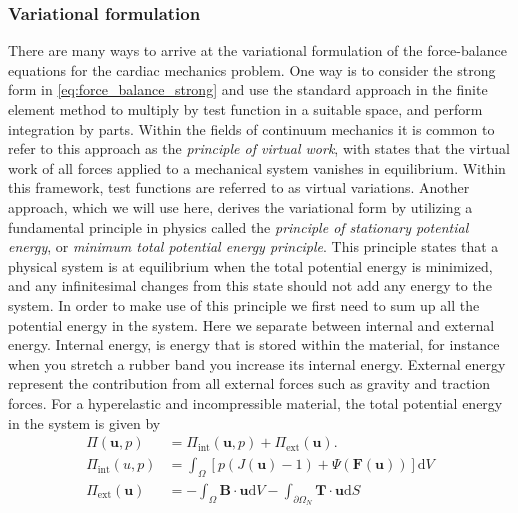 \subsubsection{Variational formulation}
\label{sec:variational_formulation}
There are many ways to arrive at the variational formulation of the
force-balance equations for the cardiac mechanics problem.  One way is
to consider the strong form in \eqref{eq:force_balance_strong} and use
the standard approach in the finite element method to multiply by
test function in a suitable space, and perform integration by
parts. Within the fields of continuum mechanics it is common to
refer to this approach as the \emph{principle of virtual work}, with states
that the virtual work of all forces applied to a mechanical system
vanishes in equilibrium. Within this framework, test functions are
referred to as virtual variations.
Another approach, which we will use here, derives the variational form
by utilizing a fundamental principle in physics
called the \emph{principle of stationary potential energy}, or
\emph{minimum total potential energy principle}. This principle states that a
physical system is at equilibrium when the total potential energy is
minimized, and any infinitesimal changes from this state should not add
any energy to the system.
In order to make use of this principle we first need to sum up all the
potential energy in the system. Here we separate between internal and
external energy. Internal energy, is energy that is stored within the
material, for instance when you stretch a rubber band you increase its
internal energy. External energy represent the contribution from all
external forces such as gravity and traction forces.
For a hyperelastic and incompressible material, the total potential
energy in the system is given by
\begin{align}
  \Pi(\mathbf{u}, p) &= \Pi_{\mathrm{int}}(\mathbf{u},p) + \Pi_{\mathrm{ext}}(\mathbf{u}). \\
  \Pi_{\mathrm{int}}(u,p) &= \int_{\Omega} \left[ p(J(\mathbf{u}) - 1) +  \Psi(\mathbf{F}(\mathbf{u})) \right] \mathrm{d}V\\
  \Pi_{\mathrm{ext}}(\mathbf{u}) &= - \int_{\Omega} \mathbf{B} \cdot \mathbf{u} \mathrm{d} V - \int_{\partial \Omega_N} \mathbf{T} \cdot \mathbf{u} \mathrm{d}S
\end{align}
